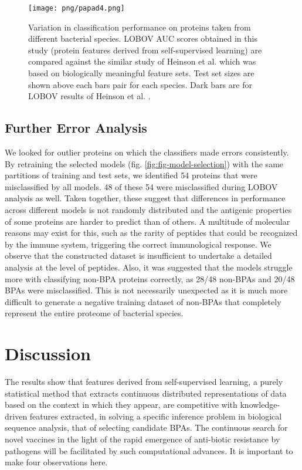 \documentclass[10pt,journal,compsoc,twoside]{IEEEtran}
\begin{document}
\begin{figure}[!t]
\centering
\texttt{[image: png/papad4.png]}
\caption{Variation in classification performance on proteins taken from different bacterial species. LOBOV AUC scores obtained in this study (protein features derived from self-supervised learning) are compared against the similar study of Heinson et al. \cite{heinson_2019} which was based on biologically meaningful feature sets. Test set sizes are shown above each bars pair for each species. Dark bars are for LOBOV results of Heinson et al. \cite{heinson_2019}.}
\label{fig:fig-lobov}
\end{figure}

\subsection{Further Error Analysis}
\label{sec:error-analysis}

We looked for outlier proteins on which the classifiers made errors consistently. By retraining the selected models (fig. \ref{fig:fig-model-selection}) with the same partitions of training and test sets, we identified 54 proteins that were misclassified by all models. 48 of these 54 were misclassified during LOBOV analysis as well. Taken together, these suggest that differences in performance across different models is not randomly distributed and the antigenic properties of some proteins are harder to predict than of others. A multitude of molecular reasons may exist for this, such as the rarity of peptides that could be recognized by the immune system, triggering the correct immunological response. We observe that the constructed dataset is insufficient to undertake a detailed analysis at the level of peptides. Also, it was suggested that the models struggle more with classifying non-BPA proteins correctly, as 28/48 non-BPAs and 20/48 BPAs were misclassified. This is not necessarily unexpected as it is much more difficult to generate a negative training dataset of non-BPAs that completely represent the entire proteome of bacterial species. 


\section{Discussion}
\label{sec:Discussion}

The results show that features derived from self-supervised learning, a purely statistical method that extracts continuous distributed representations of data based on the context in which they appear, are competitive with knowledge-driven features extracted, in solving a specific inference problem in biological sequence analysis, that of selecting candidate BPAs. The continuous search for novel vaccines in the light of the rapid emergence of anti-biotic resistance by pathogens \cite{who_antibiotic_resistance} will be facilitated by such computational advances. It is important to make four observations here. 
\end{document}
